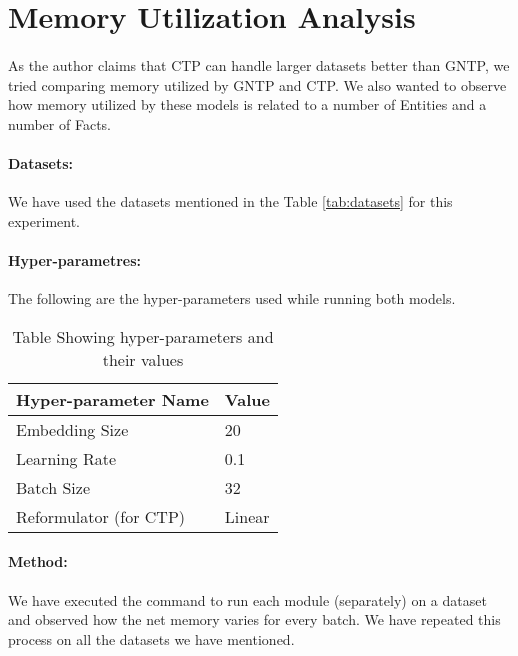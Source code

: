 \documentclass[Other]{iitddiss}
\begin{document}
\section{Memory Utilization Analysis}

\paragraph{}
As the author claims that CTP can handle larger datasets better than GNTP, we tried comparing memory utilized by GNTP and CTP. We also wanted to observe how memory utilized by these models is related to a number of Entities and a number of Facts.

\paragraph{Datasets:}
We have used the datasets mentioned in the Table \ref{tab:datasets} for this experiment.

\paragraph{Hyper-parametres:}
The following are the hyper-parameters used while running both models.

\begin{table}[H]
	\centering
	\begin{tabular}{|l|l|}
		\hline
		\textbf{Hyper-parameter Name} & \textbf{Value} \\ \hline
		Embedding Size                & 20             \\ \hline
		Learning Rate                 & 0.1            \\ \hline
		Batch Size                    & 32             \\ \hline
		Reformulator (for CTP)        & Linear         \\ \hline
	\end{tabular}
	\caption{Table Showing hyper-parameters and their values}
	\label{tab:hyperparameters}
\end{table}

\paragraph{Method: }
We have executed the command to run each module (separately) on a dataset and observed how the net memory varies for every batch. We have repeated this process on all the datasets we have mentioned.
\end{document}
